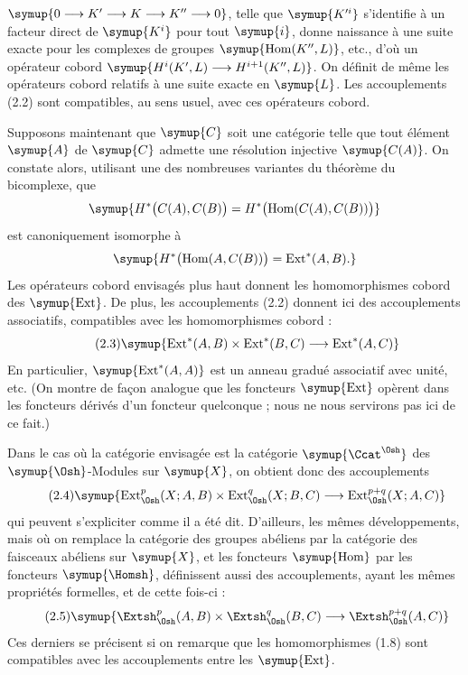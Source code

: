 $\symup{0\longrightarrow K'\longrightarrow K\longrightarrow K''\longrightarrow 0}$, telle que $\symup{K'^{i}}$ s'identifie à un facteur direct de $\symup{K^{i}}$ pour tout $\symup{i}$,
donne naissance à une suite exacte pour les complexes de groupes
$\symup{\operatorname{Hom}(K'',L)}$, etc., d'où un opérateur cobord
$\symup{H^{i}(K',L)\longrightarrow H^{i+1}(K'',L)}$.
On définit de même les opérateurs cobord relatifs à une suite exacte en $\symup{L}$. Les
accouplements (2.2) sont compatibles, au sens usuel, avec ces opérateurs cobord.

Supposons maintenant que $\symup{C}$ soit une catégorie telle que tout élément $\symup{A}$
de $\symup{C}$ admette une résolution injective $\symup{C(A)}$. On constate alors, utilisant
une des nombreuses variantes du théorème du bicomplexe, que
\[
  \symup{H^{*}\bigl(C(A),C(B)\bigr)
  =H^{*}\bigl(\operatorname{Hom}(C(A),C(B))\bigr)}
\]
est canoniquement isomorphe à
\[
  \symup{H^{*}\bigl(\operatorname{Hom}(A,C(B))\bigr)
  =\operatorname{Ext}^{*}(A,B).}
\]
Les opérateurs cobord envisagés plus haut donnent les homomorphismes cobord des
$\symup{\operatorname{Ext}}$. De plus, les accouplements (2.2) donnent ici des
accouplements associatifs, compatibles avec les homomorphismes cobord :
\begin{equation}\tag{2.3}
  \symup{\operatorname{Ext}^{*}(A,B)\times\operatorname{Ext}^{*}(B,C)
  \longrightarrow\operatorname{Ext}^{*}(A,C)}
\end{equation}
En particulier, $\symup{\operatorname{Ext}^{*}(A,A)}$ est un anneau gradué associatif
avec unité, etc. (On montre de façon analogue que les foncteurs
$\symup{\operatorname{Ext}}$ opèrent dans les foncteurs dérivés d'un foncteur
quelconque ; nous ne nous servirons pas ici de ce fait.)

Dans le cas où la catégorie envisagée est la catégorie $\symup{\Ccat^{\Osh}}$ des
$\symup{\Osh}$-Modules sur $\symup{X}$, on obtient donc des accouplements
\begin{equation}\tag{2.4}
  \symup{\operatorname{Ext}_{\Osh}^{p}(X;A,B)
  \times\operatorname{Ext}_{\Osh}^{q}(X;B,C)
  \longrightarrow\operatorname{Ext}_{\Osh}^{p+q}(X;A,C)}
\end{equation}
qui peuvent s'expliciter comme il a été dit. D'ailleurs, les mêmes
développements, mais où on remplace la catégorie des groupes abéliens par la
catégorie des faisceaux abéliens sur $\symup{X}$, et les foncteurs $\symup{\operatorname{Hom}}$
par les foncteurs $\symup{\Homsh}$, définissent aussi des accouplements, ayant les mêmes
propriétés formelles, et de  cette fois-ci :
\begin{equation}\tag{2.5}
  \symup{\Extsh_{\Osh}^{p}(A,B)\times\Extsh_{\Osh}^{q}(B,C)
  \longrightarrow\Extsh_{\Osh}^{p+q}(A,C)}
\end{equation}
Ces derniers se précisent si on remarque que les homomorphismes (1.8) sont
compatibles avec les accouplements entre les $\symup{\operatorname{Ext}}$.

